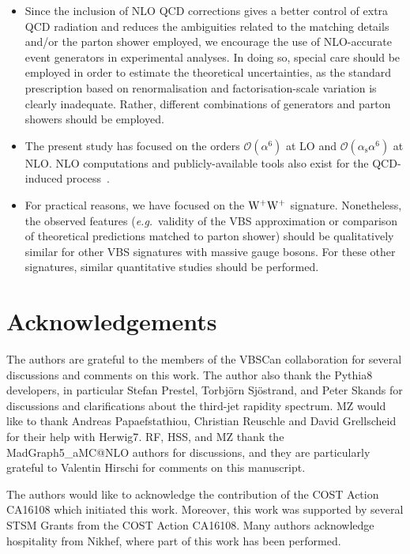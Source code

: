 \documentclass[twocolumn,epjc3]{svjour3} %
\newcommand{\alphas}{\ensuremath{\alpha_\text{s}}\xspace}
\begin{document}
\begin{itemize}
    \item Since the inclusion of NLO QCD corrections gives a better control of extra QCD radiation and reduces the ambiguities related to the 
        matching details and/or the parton shower employed, we encourage the use of NLO-accurate event generators in experimental analyses. In doing
        so, special care should be employed in order to estimate the theoretical uncertainties, as the standard prescription based on 
        renormalisation and factorisation-scale variation is clearly inadequate. Rather, different combinations of generators and parton showers should be employed.

    \item The present study has focused on the orders $\mathcal{O}{\left(\alpha^{6}\right)}$ at 
    LO and $\mathcal{O}{\left(\alphas\alpha^{6}\right)}$ at NLO. NLO computations and publicly-available tools also exist for the QCD-induced process~\cite{Rauch:2016pai,Melia:2010bm,Melia:2011gk,Campanario:2013gea,Baglio:2014uba,Biedermann:2017bss,Alwall:2014hca}.

    \item For practical reasons, we have focused on the ${\rm W}^+{\rm W}^+$ signature. Nonetheless, 
    the observed features 
    (\emph{e.g.}\ validity of the VBS approximation or comparison of theoretical predictions matched to parton shower) should 
    be qualitatively similar for other VBS signatures with massive gauge bosons. For these other signatures, similar quantitative studies should be performed.
\end{itemize}


\section*{Acknowledgements}

The authors are grateful to the members of the VBSCan collaboration for several discussions and comments on this work. The author also thank
the {\sc Pythia8} developers, in particular Stefan Prestel, Torbj{\"o}rn Sj{\"o}strand, and Peter Skands for 
discussions and clarifications about the third-jet rapidity spectrum. MZ would like to thank Andreas Papaefstathiou, Christian Reuschle and David Grellscheid 
for their help with {\sc Herwig7}. RF, HSS, and MZ thank the {\sc MadGraph5\_\-aMC@NLO} authors for discussions, and
they are particularly grateful to Valentin Hirschi for comments on this manuscript.

The authors would like to acknowledge the contribution of the COST Action CA16108 which initiated this work.
Moreover, this work was supported by several STSM Grants from the COST Action CA16108.
Many authors acknowledge hospitality from Nikhef, where part of this work has been performed.
\end{document}
